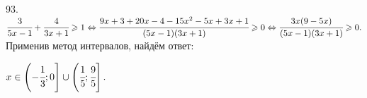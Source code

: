 93. $\cfrac{3}{5x-1}+\cfrac{4}{3x+1}\geqslant1\Leftrightarrow\cfrac{9x+3+20x-4-15x^2-5x+3x+1}{(5x-1)(3x+1)}\geqslant 0\Leftrightarrow
\cfrac{3x(9-5x)}{(5x-1)(3x+1)}\geqslant 0.$ Применив метод интервалов, найдём ответ:
\begin{figure}[ht!]
\end{figure}
$x\in\left(-\cfrac{1}{3};0\right]\cup\left(\cfrac{1}{5};\cfrac{9}{5}\right].$\newpage\noindent
